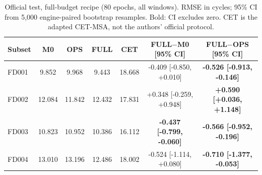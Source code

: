 \begin{table}[t]
\centering
\caption{Official test, full-budget recipe (80 epochs, all windows). RMSE in cycles; 95\% CI from 5,000 engine-paired bootstrap resamples. Bold: CI excludes zero. CET is the adapted CET-MSA, not the authors' official protocol.}
\label{tab:full}
\begin{tabular}{lcccccc}
\toprule
Subset & M0 & OPS & FULL & CET & FULL$-$M0 [95\% CI] & FULL$-$OPS [95\% CI] \\
\midrule
FD001 & 9.852 & 9.968 & 9.443 & 18.668 & -0.409 [-0.850, +0.010] & \textbf{-0.526 [-0.913, -0.146]} \\
FD002 & 12.084 & 11.842 & 12.432 & 17.831 & +0.348 [-0.259, +0.948] & \textbf{+0.590 [+0.036, +1.148]} \\
FD003 & 10.823 & 10.952 & 10.386 & 16.112 & \textbf{-0.437 [-0.799, -0.060]} & \textbf{-0.566 [-0.952, -0.196]} \\
FD004 & 13.010 & 13.196 & 12.486 & 18.002 & -0.524 [-1.114, +0.080] & \textbf{-0.710 [-1.377, -0.053]} \\
\bottomrule
\end{tabular}
\end{table}
